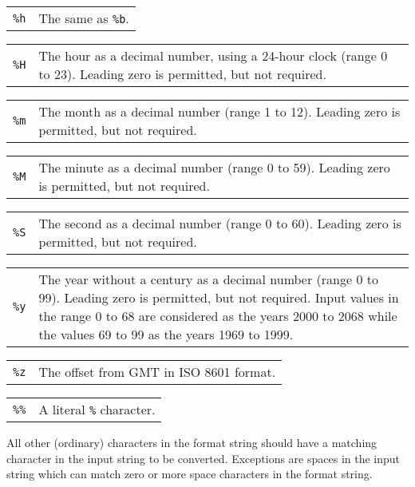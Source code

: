 \documentclass[11pt]{report}
\begin{document}
\begin{tabular}{@{}p{20pt}p{421.5pt}@{}}
{\tt\%h}&The same as {\tt\%b}.\\
\end{tabular}

\begin{tabular}{@{}p{20pt}p{421.5pt}@{}}
{\tt\%H}&The hour as a decimal number, using a 24-hour clock (range 0
to 23). Leading zero is permitted, but not required.\\
\end{tabular}

\begin{tabular}{@{}p{20pt}p{421.5pt}@{}}
{\tt\%m}&The month as a decimal number (range 1 to 12). Leading zero is
permitted, but not required.\\
\end{tabular}

\begin{tabular}{@{}p{20pt}p{421.5pt}@{}}
{\tt\%M}&The minute as a decimal number (range 0 to 59). Leading zero
is permitted, but not required.\\
\end{tabular}

\begin{tabular}{@{}p{20pt}p{421.5pt}@{}}
{\tt\%S}&The second as a decimal number (range 0 to 60). Leading zero
is permitted, but not required.\\
\end{tabular}

\begin{tabular}{@{}p{20pt}p{421.5pt}@{}}
{\tt\%y}&The year without a century as a decimal number (range 0 to 99).
Leading zero is permitted, but not required. Input values in the range
0 to 68 are considered as the years 2000 to 2068 while the values 69 to
99 as the years 1969 to 1999.\\
\end{tabular}

\begin{tabular}{@{}p{20pt}p{421.5pt}@{}}
{\tt\%z}&The offset from GMT in ISO 8601 format.\\
\end{tabular}

\begin{tabular}{@{}p{20pt}p{421.5pt}@{}}
{\tt\%\%}&A literal {\tt\%} character.\\
\end{tabular}

All other (ordinary) characters in the format string should have a
matching character in the input string to be converted. Exceptions are
spaces in the input string which can match zero or more space
characters in the format string.
\end{document}
